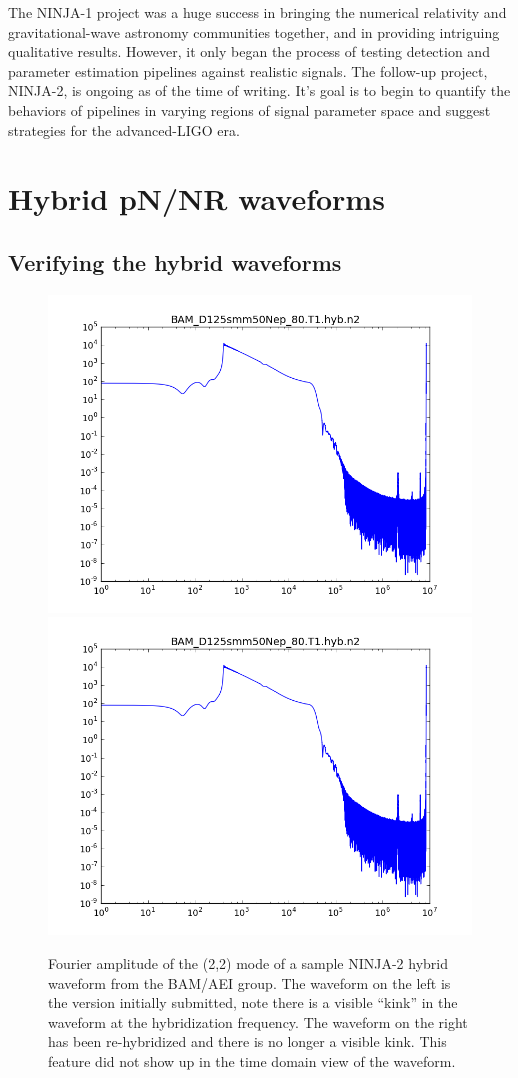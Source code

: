 The NINJA-1 project was a huge success in bringing the numerical
relativity and gravitational-wave astronomy communities together, and
in providing intriguing qualitative results.  However, it only began
the process of testing detection and parameter estimation pipelines
against realistic signals.  The follow-up project, NINJA-2, is ongoing
as of the time of writing.  It's goal is to begin to quantify the
behaviors of pipelines in varying regions of signal parameter space
and suggest strategies for the advanced-LIGO era.


\section{Hybrid pN/NR waveforms}

\subsection{Verifying the hybrid waveforms}


\begin{figure}
  \includegraphics[width=0.5\linewidth]{figures/ninja2/bam_d125smm50nep_80_t1_hyb_n2_amp.png}
  \includegraphics[width=0.5\linewidth]{figures/ninja2/bam_d125smm50nep_80_t1_hyb_n2_amp.png}
  \caption[Frequency-domain hybrid NINJA-2 waveforms]{
  \label{f:ninja2_freq_hybrids}
Fourier amplitude of the (2,2) mode of a sample NINJA-2
hybrid waveform from the BAM/AEI group.
  The waveform on the left is the version initially submitted,
note there is a visible ``kink'' in the waveform at the hybridization
frequency.  The waveform on the right has been re-hybridized and there
is no longer a visible kink.  This feature did not show up in the time
domain view of the waveform.}
\end{figure}%

